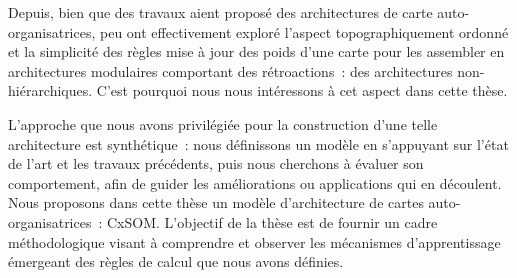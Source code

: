 Depuis, bien que des travaux aient proposé des architectures de carte auto-organisatrices, peu ont effectivement exploré l'aspect topographiquement ordonné et la simplicité des règles mise à jour des poids d'une carte pour les assembler en architectures modulaires comportant des rétroactions~: des architectures non-hiérarchiques.
C'est pourquoi nous nous intéressons à cet aspect dans cette thèse.

L'approche que nous avons privilégiée pour la construction d'une telle architecture est synthétique~: nous définissons un modèle en s'appuyant sur l'état de l'art et les travaux précédents, puis nous cherchons à évaluer son comportement, afin de guider les améliorations ou applications qui en découlent. Nous proposons dans cette thèse un modèle d'architecture de cartes auto-organisatrices~: CxSOM.
L'objectif de la thèse est de fournir un cadre méthodologique visant à comprendre et observer les mécanismes d'apprentissage émergeant des règles de calcul que nous avons définies.

